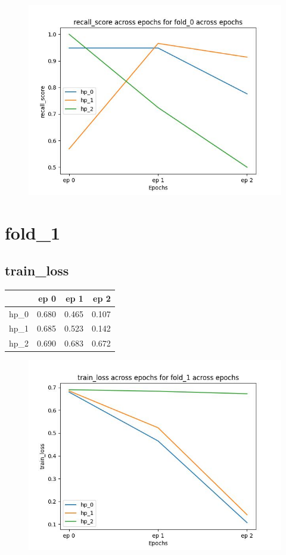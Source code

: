 \documentclass{article}
\begin{document}
\begin{figure}[H]
\includegraphics[scale = 0.75]{fold_0/recall_score}
\end{figure}
\section{fold\_1}
\subsection{train\_loss}
\begin{tabular}{lrrr}
\toprule
{} &   ep 0 &   ep 1 &   ep 2 \\
\midrule
hp\_0 &  0.680 &  0.465 &  0.107 \\
hp\_1 &  0.685 &  0.523 &  0.142 \\
hp\_2 &  0.690 &  0.683 &  0.672 \\
\bottomrule
\end{tabular}

\begin{figure}[H]
\includegraphics[scale = 0.75]{fold_1/train_loss}
\end{figure}
\end{document}
